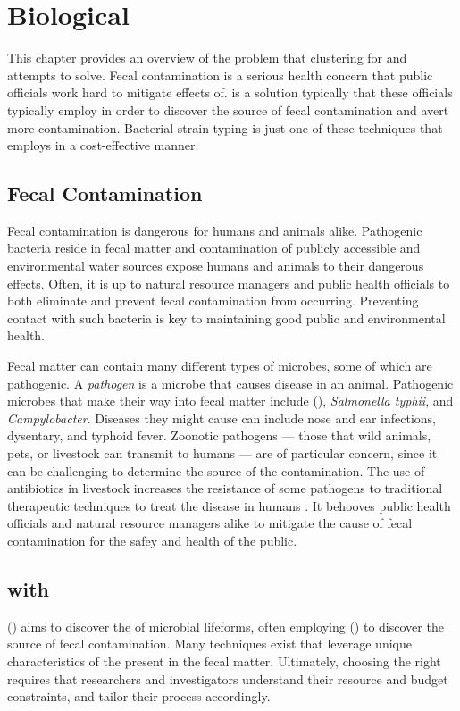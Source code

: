 \section{Biological}
\newcommand{\salmonellatyphii}{\textit{Salmonella typhii}}
\newcommand{\campylobacter}{\textit{Campylobacter}}

This chapter provides an overview of the problem that clustering for \bslong{} and \kraplong{} attempts to solve.
Fecal contamination is a serious health concern that public officials work hard to mitigate effects of.
\MSTlong{} is a solution typically that these officials typically employ in order to discover the source of fecal contamination and avert more contamination.
Bacterial strain typing is just one of these techniques that \cploplong{} employs in a cost-effective manner.

\subsection{Fecal Contamination}
Fecal contamination is dangerous for humans and animals alike.
Pathogenic bacteria reside in fecal matter and contamination of publicly accessible and environmental water sources expose humans and animals to their dangerous effects.
Often, it is up to natural resource managers and public health officials to both eliminate and prevent fecal contamination from occurring.
Preventing contact with such bacteria is key to maintaining good public and environmental health.

Fecal matter can contain many different types of microbes, some of which are pathogenic.
A \textit{pathogen} is a microbe that causes disease in an animal.
Pathogenic microbes that make their way into fecal matter include \ecolilong{} (\ecoli{}), \salmonellatyphii{}, and \campylobacter{}.
Diseases they might cause can include nose and ear infections, dysentary, and typhoid fever.
Zoonotic pathogens --- those that wild animals, pets, or livestock can transmit to humans --- are of particular concern, since it can be challenging to determine the source of the contamination.
The use of antibiotics in livestock increases the resistance of some pathogens to traditional therapeutic techniques to treat the disease in humans \cite{rogers2005detecting}.
It behooves public health officials and natural resource managers alike to mitigate the cause of fecal contamination for the safey and health of the public.

\subsection{\MSTlong{} with \FIBlong{}}
\MSTlong{} (\mst{}) aims to discover the \spec{} of microbial lifeforms, often employing \FIBlong{} (\fib{}) to discover the source of fecal contamination.
Many techniques exist that leverage unique characteristics of the \fib{} present in the fecal matter.
Ultimately, choosing the right \fib{} requires that researchers and investigators understand their resource and budget constraints, and tailor their \mst{} process accordingly.

